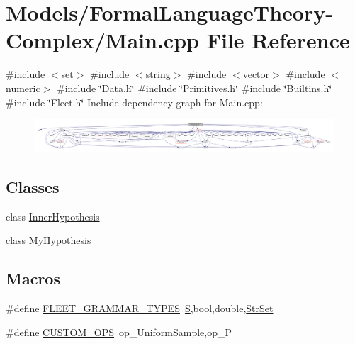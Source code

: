 \hypertarget{_formal_language_theory-_complex_2_main_8cpp}{}\section{Models/\+Formal\+Language\+Theory-\/\+Complex/\+Main.cpp File Reference}
\label{_formal_language_theory-_complex_2_main_8cpp}
{\ttfamily \#include $<$set$>$}\newline
{\ttfamily \#include $<$string$>$}\newline
{\ttfamily \#include $<$vector$>$}\newline
{\ttfamily \#include $<$numeric$>$}\newline
{\ttfamily \#include \char`\"{}Data.\+h\char`\"{}}\newline
{\ttfamily \#include \char`\"{}Primitives.\+h\char`\"{}}\newline
{\ttfamily \#include \char`\"{}Builtins.\+h\char`\"{}}\newline
{\ttfamily \#include \char`\"{}Fleet.\+h\char`\"{}}\newline
Include dependency graph for Main.\+cpp\+:
\nopagebreak
\begin{figure}[H]
\begin{center}
\leavevmode
\includegraphics[width=350pt]{_formal_language_theory-_complex_2_main_8cpp__incl}
\end{center}
\end{figure}
\subsection*{Classes}
\begin{DoxyCompactItemize}
\item 
class \hyperlink{class_inner_hypothesis}{Inner\+Hypothesis}
\item 
class \hyperlink{class_my_hypothesis}{My\+Hypothesis}
\end{DoxyCompactItemize}
\subsection*{Macros}
\begin{DoxyCompactItemize}
\item 
\#define \hyperlink{_formal_language_theory-_complex_2_main_8cpp_a89fb8e7826ca09e23da0ce4b39ee03c0}{F\+L\+E\+E\+T\+\_\+\+G\+R\+A\+M\+M\+A\+R\+\_\+\+T\+Y\+P\+ES}~\hyperlink{_formal_language_theory-_complex_2_main_8cpp_a51c40915539205f0b5add30b0d68a4cb}{S},bool,double,\hyperlink{_formal_language_theory-_complex_2_main_8cpp_a809d982ed20fa378f251596c3b5ad6b7}{Str\+Set}
\item 
\#define \hyperlink{_formal_language_theory-_complex_2_main_8cpp_a1287a8584548a58c8bff414efbac2ac4}{C\+U\+S\+T\+O\+M\+\_\+\+O\+PS}~op\+\_\+\+Uniform\+Sample,op\+\_\+P
\end{DoxyCompactItemize}
